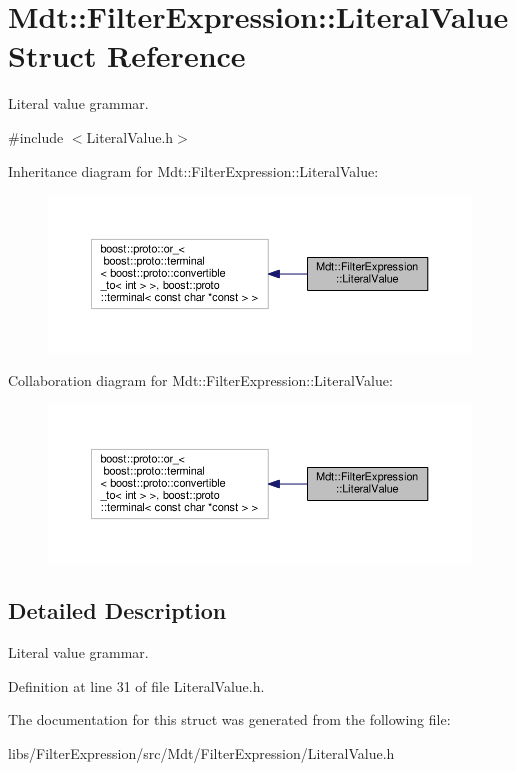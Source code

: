 \hypertarget{struct_mdt_1_1_filter_expression_1_1_literal_value}{}\section{Mdt\+:\+:Filter\+Expression\+:\+:Literal\+Value Struct Reference}
\label{struct_mdt_1_1_filter_expression_1_1_literal_value}


Literal value grammar.  




{\ttfamily \#include $<$Literal\+Value.\+h$>$}



Inheritance diagram for Mdt\+:\+:Filter\+Expression\+:\+:Literal\+Value\+:
\nopagebreak
\begin{figure}[H]
\begin{center}
\leavevmode
\includegraphics[width=350pt]{struct_mdt_1_1_filter_expression_1_1_literal_value__inherit__graph}
\end{center}
\end{figure}


Collaboration diagram for Mdt\+:\+:Filter\+Expression\+:\+:Literal\+Value\+:
\nopagebreak
\begin{figure}[H]
\begin{center}
\leavevmode
\includegraphics[width=350pt]{struct_mdt_1_1_filter_expression_1_1_literal_value__coll__graph}
\end{center}
\end{figure}


\subsection{Detailed Description}
Literal value grammar. 

Definition at line 31 of file Literal\+Value.\+h.



The documentation for this struct was generated from the following file\+:\begin{DoxyCompactItemize}
\item 
libs/\+Filter\+Expression/src/\+Mdt/\+Filter\+Expression/Literal\+Value.\+h\end{DoxyCompactItemize}
